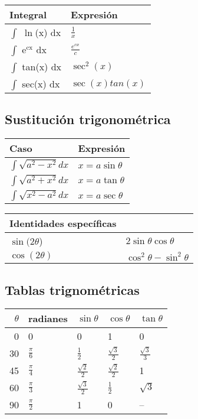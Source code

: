 \documentclass[11pt]{article}
\begin{document}
\begin{multicols}{3}
\begin{center}
\begin{tabular}{ll}
Integral & Expresión\\
\hline
$\int$ $\ln$(x) dx & $\frac{1}{x}$\\
$\int$ e$^{\text{cx}}$ dx & $\frac{e^{cx}}{c}$\\
$\int$ tan(x) dx & $\sec^2(x)$\\
$\int$ sec(x) dx & $\sec(x)tan(x)$\\
\end{tabular}
\end{center}


\subsection{Sustitución trigonométrica}
\label{sec-2-6}


\begin{center}
\begin{tabular}{ll}
Caso & Expresión\\
\hline
$\int \sqrt{a^2 -x^2} dx$ & $x = a \sin \theta$\\
$\int \sqrt{a^2 + x^2} dx$ & $x = a \tan \theta$\\
$\int \sqrt{x^2 -a^2} dx$ & $x = a \sec \theta$\\
\end{tabular}
\end{center}

\begin{center}
\begin{tabular}{ll}
Identidades específicas & \\
\hline
$\sin(2\theta$) & $2 \sin\theta \cos\theta$\\
$\cos(2\theta)$ & $\cos^2\theta - \sin^2\theta$\\
\end{tabular}
\end{center}

\subsection{Tablas trignométricas}
\label{sec-2-7}
\begin{center}
\begin{tabular}{rllll}
$\theta$ & radianes & $\sin \theta$ & $\cos \theta$ & $\tan \theta$\\
\hline
0 & 0 & 0 & 1 & 0\\
30 & $\frac{\pi}{6}$ & $\frac{1}{2}$ & $\frac{\sqrt{3}}{2}$ & $\frac{\sqrt{3}}{3}$\\
45 & $\frac{\pi}{4}$ & $\frac{\sqrt{2}}{2}$ & $\frac{\sqrt{2}}{2}$ & 1\\
60 & $\frac{\pi}{3}$ & $\frac{\sqrt{3}}{2}$ & $\frac{1}{2}$ & $\sqrt{3}$\\
90 & $\frac{\pi}{2}$ & 1 & 0 & --\\
\end{tabular}
\end{center}


\end{multicols}
\end{document}
